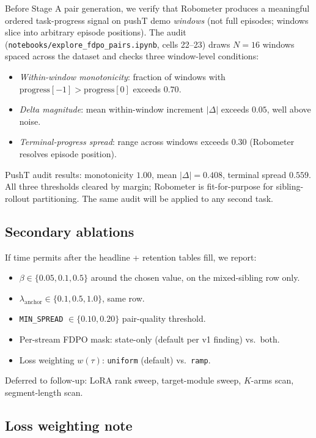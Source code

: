 \documentclass[11pt]{article}
\begin{document}
Before Stage A pair generation, we verify that Robometer produces a meaningful ordered task-progress signal on pushT demo \emph{windows} (not full episodes; windows slice into arbitrary episode positions). The audit (\texttt{notebooks/explore\_fdpo\_pairs.ipynb}, cells 22--23) draws $N=16$ windows spaced across the dataset and checks three window-level conditions:
\begin{itemize}
    \item \emph{Within-window monotonicity}: fraction of windows with $\mathrm{progress}[-1] > \mathrm{progress}[0]$ exceeds $0.70$.
    \item \emph{Delta magnitude}: mean within-window increment $|\Delta|$ exceeds $0.05$, well above noise.
    \item \emph{Terminal-progress spread}: range across windows exceeds $0.30$ (Robometer resolves episode position).
\end{itemize}
PushT audit results: monotonicity $1.00$, mean $|\Delta| = 0.408$, terminal spread $0.559$. All three thresholds cleared by margin; Robometer is fit-for-purpose for sibling-rollout partitioning. The same audit will be applied to any second task.

\subsection{Secondary ablations}
\label{sec:ablations}

If time permits after the headline + retention tables fill, we report:
\begin{itemize}
    \item $\beta \in \{0.05, 0.1, 0.5\}$ around the chosen value, on the mixed-sibling row only.
    \item $\lambda_{\mathrm{anchor}} \in \{0.1, 0.5, 1.0\}$, same row.
    \item \texttt{MIN\_SPREAD} $\in \{0.10, 0.20\}$ pair-quality threshold.
    \item Per-stream FDPO mask: state-only (default per v1 finding) vs.\ both.
    \item Loss weighting $w(\tau)$: \texttt{uniform} (default) vs.\ \texttt{ramp}.
\end{itemize}
Deferred to follow-up: LoRA rank sweep, target-module sweep, $K$-arms scan, segment-length scan.

\subsection{Loss weighting note}
\label{sec:weighting}
\end{document}
